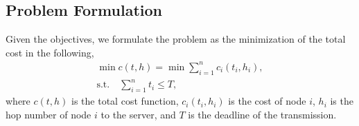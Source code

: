 \documentclass[journal]{IEEEtran}  %
\begin{document}
\subsection{Problem Formulation}
Given the objectives, we formulate the problem as the minimization of the
total cost in the following,
\begin{equation}
\begin{aligned}
\min c(t,h) = \min \sum_{i=1}^n c_i(t_i,h_i),  \\
\text{s.t.} \quad \sum_{i=1}^n t_i \leq T,  
\label{equ:maxmin}
\end{aligned}
\end{equation}
where $c(t,h)$ is the total cost function, $c_i(t_i,h_i)$ is the cost of node
$i$, $h_i$ is the hop number of node $i$ to the server, and $T$ is the
deadline of the transmission.  
\end{document}
